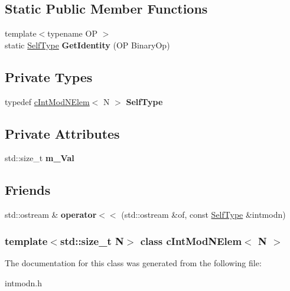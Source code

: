 \subsection*{\-Static \-Public \-Member \-Functions}
\begin{DoxyCompactItemize}
\item 
\hypertarget{classcIntModNElem_a5130425382c5a5bdfd28f3b7742a4878}{{\footnotesize template$<$typename O\-P $>$ }\\static \hyperlink{classcIntModNElem}{\-Self\-Type} {\bfseries \-Get\-Identity} (\-O\-P \-Binary\-Op)}\label{classcIntModNElem_a5130425382c5a5bdfd28f3b7742a4878}

\end{DoxyCompactItemize}
\subsection*{\-Private \-Types}
\begin{DoxyCompactItemize}
\item 
\hypertarget{classcIntModNElem_ae78e9df5cc365eb679d0007191f86424}{typedef \hyperlink{classcIntModNElem}{c\-Int\-Mod\-N\-Elem}$<$ \-N $>$ {\bfseries \-Self\-Type}}\label{classcIntModNElem_ae78e9df5cc365eb679d0007191f86424}

\end{DoxyCompactItemize}
\subsection*{\-Private \-Attributes}
\begin{DoxyCompactItemize}
\item 
\hypertarget{classcIntModNElem_abaf8f2803c5a508b807c7e142da41b51}{std\-::size\-\_\-t {\bfseries m\-\_\-\-Val}}\label{classcIntModNElem_abaf8f2803c5a508b807c7e142da41b51}

\end{DoxyCompactItemize}
\subsection*{\-Friends}
\begin{DoxyCompactItemize}
\item 
\hypertarget{classcIntModNElem_ac999b0fda4f712c41d0a8f38c4584a8d}{std\-::ostream \& {\bfseries operator$<$$<$} (std\-::ostream \&of, const \hyperlink{classcIntModNElem}{\-Self\-Type} \&intmodn)}\label{classcIntModNElem_ac999b0fda4f712c41d0a8f38c4584a8d}

\end{DoxyCompactItemize}
\subsubsection*{template$<$std\-::size\-\_\-t \-N$>$ class c\-Int\-Mod\-N\-Elem$<$ N $>$}



\-The documentation for this class was generated from the following file\-:\begin{DoxyCompactItemize}
\item 
intmodn.\-h\end{DoxyCompactItemize}
